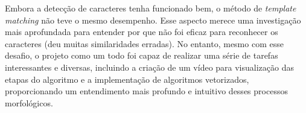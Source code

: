 \documentclass[english, 
               brazil, 
               bsc] %
               {dcomp-abntex2}
\begin{document}
Embora a detecção de caracteres tenha funcionado bem, o método de \textit{template matching} não teve o mesmo desempenho. Esse aspecto merece uma investigação mais aprofundada para entender por que não foi eficaz para reconhecer os caracteres (deu muitas similaridades erradas). No entanto, mesmo com esse desafio, o projeto como um todo foi capaz de realizar uma série de tarefas interessantes e diversas, incluindo a criação de um vídeo para visualização das etapas do algoritmo e a implementação de algoritmos vetorizados, proporcionando um entendimento mais profundo e intuitivo desses processos morfológicos.






\postextual


\renewcommand{\chapnumfont}{\chaptitlefont}
\renewcommand{\afterchapternum}{}
% 
% 
\end{document}
